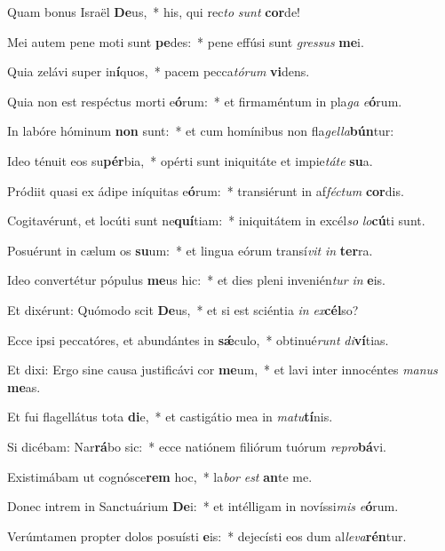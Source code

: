 \item Quam bonus Israël \textbf{De}us,~* his, qui rec\textit{to} \textit{sunt} \textbf{cor}de!
\item Mei autem pene moti sunt \textbf{pe}des:~* pene effúsi sunt \textit{gres}\textit{sus} \textbf{me}i.
\item Quia zelávi super in\textbf{í}quos,~* pacem pecca\textit{tó}\textit{rum} \textbf{vi}dens.
\item Quia non est respéctus morti e\textbf{ó}rum:~* et firmaméntum in pla\textit{ga} \textit{e}\textbf{ó}rum.
\item In labóre hóminum \textbf{non} sunt:~* et cum homínibus non fla\textit{gel}\textit{la}\textbf{bún}tur:
\item Ideo ténuit eos su\textbf{pér}bia,~* opérti sunt iniquitáte et impie\textit{tá}\textit{te} \textbf{su}a.
\item Pródiit quasi ex ádipe iníquitas e\textbf{ó}rum:~* transiérunt in af\textit{féc}\textit{tum} \textbf{cor}dis.
\item Cogitavérunt, et locúti sunt ne\textbf{quí}tiam:~* iniquitátem in excél\textit{so} \textit{lo}\textbf{cú}ti sunt.
\item Posuérunt in cælum os \textbf{su}um:~* et lingua eórum transí\textit{vit} \textit{in} \textbf{ter}ra.
\item Ideo convertétur pópulus \textbf{me}us hic:~* et dies pleni invenién\textit{tur} \textit{in} \textbf{e}is.
\item Et dixérunt: Quómodo scit \textbf{De}us,~* et si est sciéntia \textit{in} \textit{ex}\textbf{cél}so?
\item Ecce ipsi peccatóres, et abundántes in \textbf{sǽ}culo,~* obtinué\textit{runt} \textit{di}\textbf{ví}tias.
\item Et dixi: Ergo sine causa justificávi cor \textbf{me}um,~* et lavi inter innocéntes \textit{ma}\textit{nus} \textbf{me}as.
\item Et fui flagellátus tota \textbf{di}e,~* et castigátio mea in \textit{ma}\textit{tu}\textbf{tí}nis.
\item Si dicébam: Nar\textbf{rá}bo sic:~* ecce natiónem filiórum tuórum \textit{re}\textit{pro}\textbf{bá}vi.
\item Existimábam ut cognósce\textbf{rem} hoc,~* la\textit{bor} \textit{est} \textbf{an}te me.
\item Donec intrem in Sanctuárium \textbf{De}i:~* et intélligam in novíssi\textit{mis} \textit{e}\textbf{ó}rum.
\item Verúmtamen propter dolos posuísti \textbf{e}is:~* dejecísti eos dum al\textit{le}\textit{va}\textbf{rén}tur.
